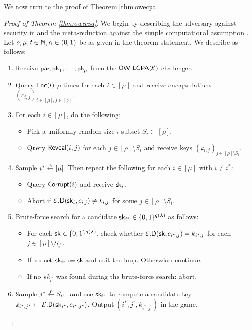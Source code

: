 We now turn to the proof of Theorem \ref{thm:owecpa}.
\begin{proof}[Proof of Theorem \ref{thm:owecpa}]
  We begin by describing the adversary \advA against \OWECPA security in \KEM
  and the meta-reduction \redM against the simple computational assumption \Simple.
  Let \(\rho, \mu, t \in \mathbb{N}, \alpha \in (0,1)\) be as given in the theorem statement.
  We describe \advA as follows:

  \begin{enumerate}[itemsep=0.1cm]
    \item Receive \(\mathsf{par}, \mathsf{pk}_{1}, \ldots, \mathsf{pk}_{\mu}\) from the \(\mathsf{OW}\text{-}\mathsf{ECPA}(\mathcal{E})\) challenger.
    \item Query \(\mathsf{Enc}(i)\) \(\rho\) times for each \(i \in [\mu]\) and receive encapsulations \((c_{i,j})_{i \in [\mu], j \in [\rho]}\).
    \item For each \(i \in [\mu]\), do the following:
          \begin{itemize}[label={\textbullet},itemsep=0.1cm]
            \item Pick a uniformly random size \(t\) subset \(S_{i} \subset [\rho]\).
            \item Query \(\mathsf{Reveal}(i,j)\) for each \(j \in [\rho] \setminus S_{i}\)
                  and receive keys \((k_{i,j})_{j \in [\rho] \setminus S_{i}}\).
          \end{itemize}
    \item\label{advA:corrupt} Sample \(i^{*} \sampleR [\mu]\). Then repeat the following for each \(i \in [\mu]\) with \(i \ne i^{*}\):
          \begin{itemize}[label={\textbullet},itemsep=0.1cm]
            \item Query \(\mathsf{Corrupt}(i)\) and receive \(\mathsf{sk}_{i}\).
            \item Abort if \(\mathcal{E}.\mathsf{D}(\mathsf{sk}_{i},c_{i,j}) \ne k_{i,j}\) for some \(j \in [\rho] \setminus S_{i}\).
          \end{itemize}
     \item\label{advA:brute} Brute-force search for a candidate \(\mathsf{sk}_{i^{*}} \in \{0,1\}^{q(\lambda)}\) as follows:
          \begin{itemize}[label={\textbullet},itemsep=0.1cm]
            \item For each \(\mathsf{sk} \in \{0,1\}^{q(\lambda)}\),
                  check whether \(\mathcal{E}.\mathsf{D}(\mathsf{sk},c_{i^{*},j}) = k_{i^{*},j}\) for each \(j \in [\rho] \setminus S_{i^{*}}\).
            \item If so: set \(\mathsf{sk}_{i^{*}} := \mathsf{sk}\) and exit the loop. Otherwise: continue.
            \item If no \(sk_{i^{*}}\) was found during the brute-force search: abort.
          \end{itemize}
    \item\label{advA:final} Sample \(j^{*} \sampleR S_{i^{*}}\),
          and use \(\mathsf{sk}_{i^{*}}\) to compute a candidate key \(k_{i^{*}, j^{*}} \leftarrow \mathcal{E}.\mathsf{D}(\mathsf{sk}_{i^{*}},c_{i^{*}, j^{*}})\).
          Output \((i^{*}, j^{*}, k_{i^{*}, j^{*}})\) in the \OWECPA game.
  \end{enumerate}


\end{proof}
